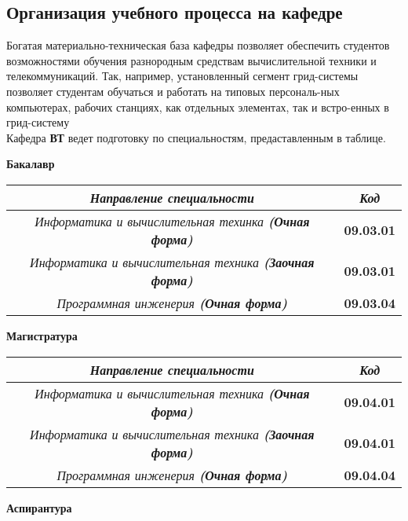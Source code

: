 \documentclass[12pt,a4paper]{article}
\begin{document}
\begin{flushleft}
\subsection{Организация учебного процесса на кафедре}
\begin{flushleft}
\large
Богатая материально-техническая база кафедры позволяет обеспечить студентов возможностями обучения разнородным средствам вычислительной техники и телекоммуникаций. Так, например, установленный сегмент грид-системы позволяет студентам обучаться и работать на типовых персональ-ных компьютерах, рабочих станциях, как отдельных элементах, так и встро-енных в грид-систему
\\
Кафедра \textbf{ВТ} ведет подготовку по специальностям, предаставленным в таблице.
\newpage
\begin{center}
\textbf{\Large Бакалавр}
\end{center}
\begin{tabular}{|| c || c ||}
\hline
\emph{Направление специальности} & \emph{Код} \\ \hline
\textit{Информатика и вычислительная техинка \textbf{(Очная форма)}} & \textbf{09.03.01} \\
\textit{Информатика и вычислительная техника \textbf{(Заочная форма)}} & \textbf{09.03.01} \\
\textit{Программная инженерия \textbf{(Очная форма)}} & \textbf{09.03.04 } \\
\hline
\end{tabular}

\begin{center}
\textbf{\Large Магистратура}
\end{center}

\begin{tabular}{|| c || c ||}
\hline
\emph{Направление специальности} & \emph{Код} \\ \hline
\textit{Информатика и вычислительная техника \textbf{(Очная форма)}} & \textbf{09.04.01} \\
\textit{Информатика и вычислительная техника \textbf{(Заочная форма)}} & \textbf{09.04.01} \\
\textit{Программная инженерия \textbf{(Очная форма)}} & \textbf{09.04.04} \\
\hline
\end{tabular}

\begin{center}
\textbf{\Large Аспирантура}
\end{center}


\end{flushleft}
\end{flushleft}
\end{document}
